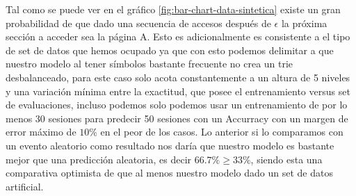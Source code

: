 	Tal como se puede ver en el gráfico \ref{fig:bar-chart-data-sintetica} existe un gran probabilidad de que dado una secuencia de accesos después de $\epsilon$ la próxima sección a acceder sea la página A.
	Esto es adicionalmente es consistente a el tipo de set de datos que hemos ocupado ya que con esto podemos delimitar a que nuestro modelo al tener símbolos bastante frecuente no crea un trie desbalanceado, para este caso solo acota constantemente a un altura de 5 niveles y una variación mínima entre la exactitud, que posee el entrenamiento versus set de evaluaciones, incluso podemos solo podemos usar un entrenamiento de por lo menos 30 sesiones para predecir 50 sesiones con un Accurracy con un margen de error máximo de $10\%$ en el peor de los casos. 
	Lo anterior si lo comparamos con un evento aleatorio como resultado nos daría que nuestro modelo es bastante mejor que una predicción aleatoria, es decir $ 66.7\%  \geq 33\%$, siendo esta una comparativa optimista de que al menos nuestro modelo dado un set de datos artificial.
	
	